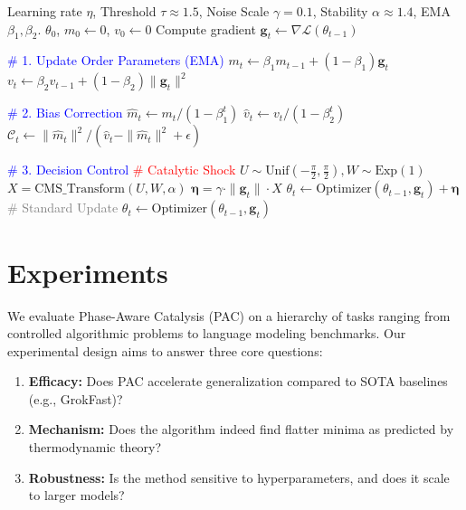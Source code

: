 \documentclass{article}
\theoremstyle{plain}
\theoremstyle{definition}
\theoremstyle{remark}
\newcommand{\C}{\mathcal{C}} %
\newcommand{\Lloss}{\mathcal{L}}
\newcommand{\gvec}{\mathbf{g}}
\newcommand{\noise}{\boldsymbol{\eta}}
\begin{document}
\begin{algorithm}[tb]
   \caption{Phase-Aware Catalysis (PAC)}
   \label{alg:pac}
\begin{algorithmic}
    Learning rate $\eta$, Threshold $\tau \approx 1.5$, Noise Scale $\gamma=0.1$, Stability $\alpha \approx 1.4$, EMA $\beta_1, \beta_2$.
    $\theta_0$, $m_0 \leftarrow 0$, $v_0 \leftarrow 0$
       \STATE Compute gradient $\gvec_t \leftarrow \nabla \Lloss(\theta_{t-1})$
       
       \STATE \textcolor{blue}{\# 1. Update Order Parameters (EMA)}
       \STATE $m_t \leftarrow \beta_1 m_{t-1} + (1-\beta_1) \gvec_t$
       \STATE $v_t \leftarrow \beta_2 v_{t-1} + (1-\beta_2) \| \gvec_t \|^2$
       
       \STATE \textcolor{blue}{\# 2. Bias Correction}
       \STATE $\hat{m}_t \leftarrow m_t / (1 - \beta_1^t)$
       \STATE $\hat{v}_t \leftarrow v_t / (1 - \beta_2^t)$
       \STATE $\C_t \leftarrow \| \hat{m}_t \|^2 / (\hat{v}_t - \| \hat{m}_t \|^2 + \epsilon)$
       
       \STATE \textcolor{blue}{\# 3. Decision Control}
       \IF{$\C_t > \tau$ \textbf{and} $t > T_{\text{warmup}}$}
           \STATE \textcolor{red}{\# Catalytic Shock}
           \STATE $U \sim \text{Unif}(-\frac{\pi}{2}, \frac{\pi}{2}), W \sim \text{Exp}(1)$
           \STATE $X = \text{CMS\_Transform}(U, W, \alpha)$
           \STATE $\noise = \gamma \cdot \|\gvec_t\| \cdot X$
           \STATE $\theta_t \leftarrow \text{Optimizer}(\theta_{t-1}, \gvec_t) + \noise$
       \ELSE
           \STATE \textcolor{gray}{\# Standard Update}
           \STATE $\theta_t \leftarrow \text{Optimizer}(\theta_{t-1}, \gvec_t)$
       \ENDIF
   \ENDFOR
\end{algorithmic}
\end{algorithm}

\section{Experiments}
\label{sec:experiments}

We evaluate Phase-Aware Catalysis (PAC) on a hierarchy of tasks ranging from controlled algorithmic problems to language modeling benchmarks. Our experimental design aims to answer three core questions:
\begin{enumerate}
    \item \textbf{Efficacy:} Does PAC accelerate generalization compared to SOTA baselines (e.g., GrokFast)?
    \item \textbf{Mechanism:} Does the algorithm indeed find flatter minima as predicted by thermodynamic theory?
    \item \textbf{Robustness:} Is the method sensitive to hyperparameters, and does it scale to larger models?
\end{enumerate}
\end{document}

